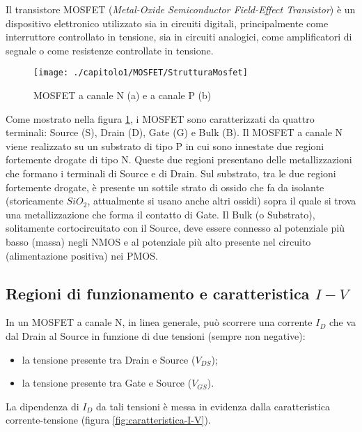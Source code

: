 Il transistore MOSFET (\emph{Metal-Oxide Semiconductor Field-Effect Transistor}) è un dispositivo elettronico utilizzato sia in circuiti digitali, principalmente come interruttore controllato in tensione, sia in circuiti analogici, come amplificatori di segnale o come resistenze controllate in tensione.\\

\begin{figure}[H]
  \centering
  \texttt{[image: ./capitolo1/MOSFET/StrutturaMosfet]}
  \caption[Struttura dei MOSFET]{MOSFET a canale N (a) e a canale P (b) \cite{transistore_MOSFET:From_MOSFET_to_FinFET_to_GAAFET}}
  \label{fig:StrutturaMosfet}
\end{figure}

Come mostrato nella figura \ref{fig:StrutturaMosfet}, i MOSFET sono caratterizzati da quattro terminali: Source (S), Drain (D), Gate (G) e Bulk (B).
Il MOSFET a canale N viene realizzato su un substrato di tipo P in cui sono innestate due regioni fortemente drogate di tipo N. Queste due regioni presentano delle metallizzazioni che formano i terminali di Source e di Drain. Sul substrato, tra le due regioni fortemente drogate, è presente un sottile strato di ossido che fa da isolante (storicamente $SiO_2$, attualmente si usano anche altri ossidi) sopra il quale si trova una metallizzazione che forma il contatto di Gate. Il Bulk (o Substrato), solitamente cortocircuitato con il Source, deve essere connesso al potenziale più basso (massa) negli NMOS e al potenziale più alto presente nel circuito (alimentazione positiva) nei PMOS. \\

\subsection{Regioni di funzionamento e caratteristica $I-V$}


In un MOSFET a canale N, in linea generale, può scorrere una corrente $I_D$ che va dal Drain al Source in funzione di due tensioni (sempre non negative): 
\begin{itemize}
  \item la tensione presente tra Drain e Source ($V_{DS}$);
  \item la tensione presente tra Gate e Source ($V_{GS}$).  
\end{itemize}

La dipendenza di $I_D$ da tali tensioni è messa in evidenza dalla caratteristica corrente-tensione (figura \ref{fig:caratteristica-I-V}).

